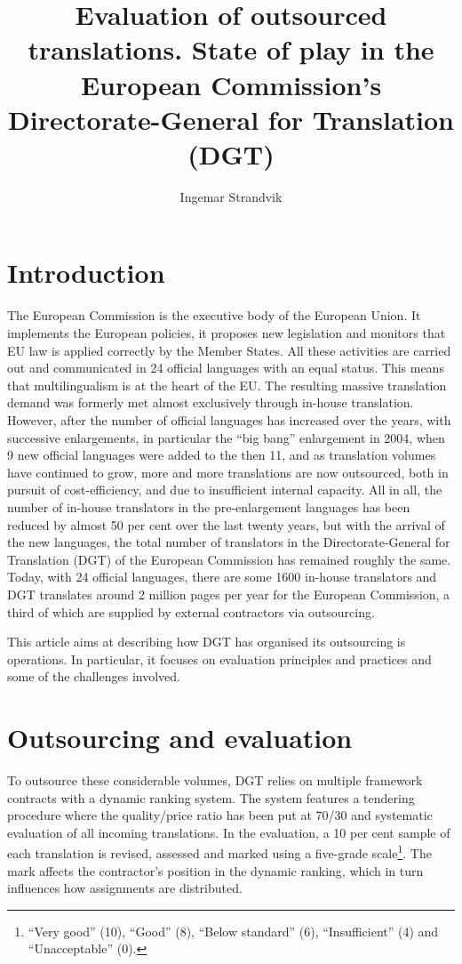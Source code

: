 \documentclass[output=paper]{langsci/langscibook}
\author{Ingemar Strandvik\affiliation{Directorate-General for Translation, European Commission}}
\title{Evaluation of outsourced translations. State of play in the European Commission's Directorate-General for Translation (DGT)}
\begin{document}
\section{Introduction}\label{sec:strandvik:strandvik:1} 
 

The European Commission is the executive body of the European Union. It implements the European policies, it proposes new legislation and monitors that EU law is applied correctly by the Member States. All these activities are carried out and communicated in 24 official languages with an equal status. This means that multilingualism is at the heart of the EU. The resulting massive translation demand was formerly met almost exclusively through in-house translation. However, after the number of official languages has increased over the years, with successive enlargements, in particular the ``big bang'' enlargement in 2004, when 9 new official languages were added to the then 11, and as translation volumes have continued to grow, more and more translations are now outsourced, both in pursuit of cost-efficiency, and due to insufficient internal capacity. All in all, the number of in-house translators in the pre-enlargement languages has been reduced by almost 50 per cent over the last twenty years, but with the arrival of the new languages, the total number of translators in the Directorate-General for Translation (DGT) of the European Commission has remained roughly the same. Today, with 24 official languages, there are some 1600 in-house translators and DGT translates around 2 million pages per year for the European Commission, a third of which are supplied by external contractors via outsourcing. 

This article aims at describing how DGT has organised its outsourcing is operations. In particular, it focuses on evaluation principles and practices and some of the challenges involved.

\section{Outsourcing and evaluation}\label{sec:strandvik:strandvic:2}

To outsource these considerable volumes, DGT relies on multiple framework contracts with a dynamic ranking system. The system features a tendering procedure where the quality/price ratio has been put at 70/30 and systematic evaluation of all incoming translations. In the evaluation, a 10 per cent sample of each translation is revised, assessed and marked using a five-grade scale\footnote{``Very good'' (10), ``Good'' (8), ``Below standard'' (6), ``Insufficient'' (4) and ``Unacceptable'' (0).}. The mark affects the contractor's position in the dynamic ranking, which in turn influences how assignments are distributed.
\end{document}
